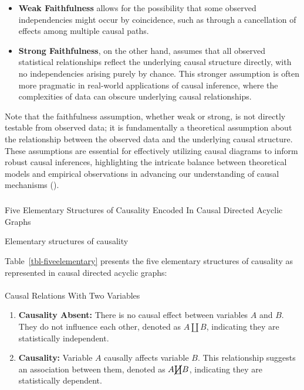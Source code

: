 \documentclass[
  single column]{article}
\makeatletter
\let\oldparagraph\paragraph
\renewcommand{\paragraph}{
    \@ifstar
      \xxxParagraphStar
      \xxxParagraphNoStar
  }
\newcommand{\xxxParagraphStar}[1]{\oldparagraph*{#1}\mbox{}}
\newcommand{\xxxParagraphNoStar}[1]{\oldparagraph{#1}\mbox{}}
\let\oldsubparagraph\subparagraph
\renewcommand{\subparagraph}{
    \@ifstar
      \xxxSubParagraphStar
      \xxxSubParagraphNoStar
  }
\newcommand{\xxxSubParagraphStar}[1]{\oldsubparagraph*{#1}\mbox{}}
\newcommand{\xxxSubParagraphNoStar}[1]{\oldsubparagraph{#1}\mbox{}}
\providecommand{\tightlist}{%
  \setlength{\itemsep}{0pt}\setlength{\parskip}{0pt}}\usepackage{longtable,booktabs,array}
\makeatother
\begin{document}
\begin{itemize}
\tightlist
\item
  \textbf{Weak Faithfulness} allows for the possibility that some
  observed independencies might occur by coincidence, such as through a
  cancellation of effects among multiple causal paths.
\item
  \textbf{Strong Faithfulness}, on the other hand, assumes that all
  observed statistical relationships reflect the underlying causal
  structure directly, with no independencies arising purely by chance.
  This stronger assumption is often more pragmatic in real-world
  applications of causal inference, where the complexities of data can
  obscure underlying causal relationships.
\end{itemize}

Note that the faithfulness assumption, whether weak or strong, is not
directly testable from observed data; it is fundamentally a theoretical
assumption about the relationship between the observed data and the
underlying causal structure. These assumptions are essential for
effectively utilizing causal diagrams to inform robust causal
inferences, highlighting the intricate balance between theoretical
models and empirical observations in advancing our understanding of
causal mechanisms ().

\subparagraph{Five Elementary Structures of Causality Encoded In Causal
Directed Acyclic
Graphs}\label{five-elementary-structures-of-causality-encoded-in-causal-directed-acyclic-graphs}

\begin{table}

\caption{\label{tbl-fiveelementary}Elementary structures of causality}

\centering{

\terminologydirectedgraph

}

\end{table}%

Table~\ref{tbl-fiveelementary} presents the five elementary structures
of causality as represented in causal directed acyclic graphs:

\paragraph{Causal Relations With Two
Variables}\label{causal-relations-with-two-variables}

\begin{enumerate}
\def\labelenumi{\arabic{enumi}.}
\tightlist
\item
  \textbf{Causality Absent:} There is no causal effect between variables
  \(A\) and \(B\). They do not influence each other, denoted as
  \(A \coprod B\), indicating they are statistically independent.
\item
  \textbf{Causality:} Variable \(A\) causally affects variable \(B\).
  This relationship suggests an association between them, denoted as
  \(A \cancel\coprod B\), indicating they are statistically dependent.
\end{enumerate}
\end{document}

